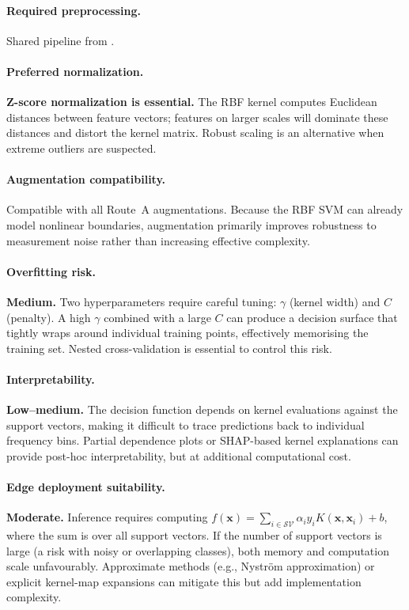 \paragraph{Required preprocessing.}
Shared pipeline from .

\paragraph{Preferred normalization.}
\textbf{Z-score normalization is essential.}  The RBF kernel computes
Euclidean distances between feature vectors; features on larger scales
will dominate these distances and distort the kernel matrix.  Robust
scaling is an alternative when extreme outliers are suspected.

\paragraph{Augmentation compatibility.}
Compatible with all Route~A augmentations.  Because the RBF SVM can
already model nonlinear boundaries, augmentation primarily improves
robustness to measurement noise rather than increasing effective
complexity.

\paragraph{Overfitting risk.}
\textbf{Medium.}  Two hyperparameters require careful tuning:
$\gamma$ (kernel width) and $C$ (penalty).  A high $\gamma$ combined
with a large $C$ can produce a decision surface that tightly wraps
around individual training points, effectively memorising the
training set.  Nested cross-validation is essential to control this
risk.

\paragraph{Interpretability.}
\textbf{Low--medium.}  The decision function depends on kernel
evaluations against the support vectors, making it difficult to trace
predictions back to individual frequency bins.  Partial dependence
plots or SHAP-based kernel explanations can provide post-hoc
interpretability, but at additional computational cost.

\paragraph{Edge deployment suitability.}
\textbf{Moderate.}  Inference requires computing
$f(\mathbf{x}) = \sum_{i \in \mathcal{SV}} \alpha_i y_i
K(\mathbf{x}, \mathbf{x}_i) + b$,
where the sum is over all support vectors.  If the number of support
vectors is large (a risk with noisy or overlapping classes), both
memory and computation scale unfavourably.  Approximate methods (e.g.,
Nyström approximation) or explicit kernel-map expansions can mitigate
this but add implementation complexity.

